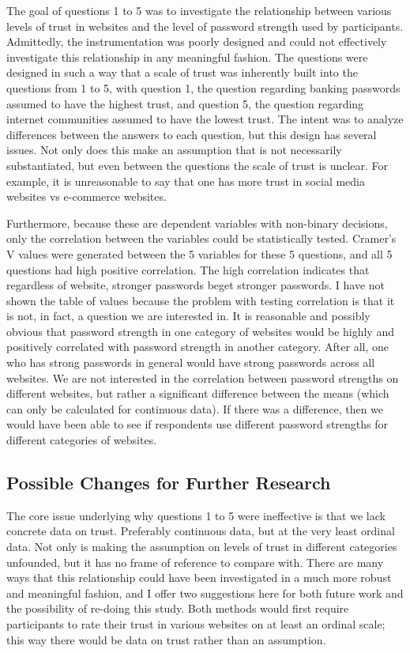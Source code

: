 \documentclass[letterpaper, 10 pt, conference]{ieeeconf}  %
\begin{document}
The goal of questions 1 to 5 was to investigate the relationship between various levels of trust in websites and the level of password strength used by participants. Admittedly, the instrumentation was poorly designed and could not effectively investigate this relationship in any meaningful fashion. The questions were designed in such a way that a scale of trust was inherently built into the questions from 1 to 5, with question 1, the question regarding banking passwords assumed to have the highest trust, and question 5, the question regarding internet communities assumed to have the lowest trust. The intent was to analyze differences between the answers to each question, but this design has several issues. Not only does this make an assumption that is not necessarily substantiated, but even between the questions the scale of trust is unclear. For example, it is unreasonable to say that one has more trust in social media websites vs e-commerce websites. 

Furthermore, because these are dependent variables with non-binary decisions, only the correlation between the variables could be statistically tested. Cramer’s V values were generated between the 5 variables for these 5 questions, and all 5 questions had high positive correlation. The high correlation indicates that regardless of website, stronger passwords beget stronger passwords. I have not shown the table of values because the problem with testing correlation is that it is not, in fact, a question we are interested in. It is reasonable and possibly obvious that password strength in one category of websites would be highly and positively correlated with password strength in another category. After all, one who has strong passwords in general would have strong passwords across all websites. We are not interested in the correlation between password strengths on different websites, but rather a significant difference between the means (which can only be calculated for continuous data). If there was a difference, then we would have been able to see if respondents use different password strengths for different categories of websites.

\subsection{Possible Changes for Further Research}

The core issue underlying why questions 1 to 5 were ineffective is that we lack concrete data on trust. Preferably continuous data, but at the very least ordinal data. Not only is making the assumption on levels of trust in different categories unfounded, but it has no frame of reference to compare with. There are many ways that this relationship could have been investigated in a much more robust and meaningful fashion, and I offer two suggestions here for both future work and the possibility of re-doing this study. Both methods would first require participants to rate their trust in various websites on at least an ordinal scale; this way there would be data on trust rather than an assumption.
\end{document}
